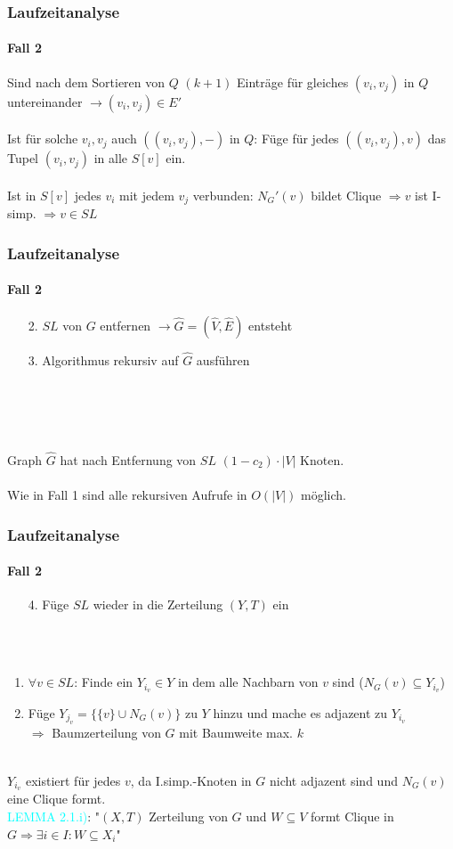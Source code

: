\begin{frame}
\frametitle{Laufzeitanalyse}
\framesubtitle{Fall 2}

Sind nach dem Sortieren von $Q$ $(k+1)$ Einträge für gleiches $(v_i, v_j)$ in $Q$ untereinander $\rightarrow (v_i, v_j) \in E'$ \\
\ \\
Ist für solche $v_i, v_j$ auch $((v_i, v_j), -)$ in $Q$: Füge für jedes $((v_i, v_j), v)$ das Tupel $(v_i, v_j)$ in alle $S[v]$ ein.\\
\ \\
Ist in $S[v]$ jedes $v_i$ mit jedem $v_j$ verbunden: $N_G'(v)$ bildet Clique $\Rightarrow v$ ist I-simp. $\Rightarrow v \in SL$
\end{frame}


\begin{frame}
\frametitle{Laufzeitanalyse}
\framesubtitle{Fall 2}

\begin{enumerate}
	\item[2.] $SL$ von $G$ entfernen $\rightarrow \widehat{G}=(\widehat{V}, \widehat{E})$ entsteht %
	\item[3.] Algorithmus rekursiv auf $\widehat{G}$ ausführen
\end{enumerate}
\ \\
\ \\
\ \\
\ \\
Graph $\widehat{G}$ hat nach Entfernung von $SL$ $(1 - c_2) \cdot |V|$ Knoten. \\
\ \\
Wie in Fall 1 sind alle rekursiven Aufrufe in $O(|V|)$ möglich. \\

\end{frame}


\begin{frame}
\frametitle{Laufzeitanalyse}
\framesubtitle{Fall 2}

\begin{enumerate}
	\item[4.] Füge $SL$ wieder in die Zerteilung $(Y,T)$ ein
\end{enumerate}
\ \\
\ \\
\begin{enumerate}
	\item $\forall v \in SL$: Finde ein $Y_{i_v} \in Y$ in dem alle Nachbarn von $v$ sind ($N_G(v) \subseteq Y_{i_v}$)
	\item Füge $Y_{j_v} = \{ \{v\} \cup N_G(v) \}$ zu $Y$ hinzu und mache es adjazent zu $Y_{i_v}$ \\
	$\Rightarrow$ Baumzerteilung von $G$ mit Baumweite max. $k$
\end{enumerate}
\ \\
$Y_{i_v}$ existiert für jedes $v$, da I.simp.-Knoten in $G$ nicht adjazent sind und $N_G(v)$ eine Clique formt. \\
\textcolor{cyan}{LEMMA 2.1.i)}: "$(X,T)$ Zerteilung von $G$ und $W \subseteq V$ formt Clique in $G \Rightarrow \exists i \in I: W \subseteq X_i$"
\end{frame}

